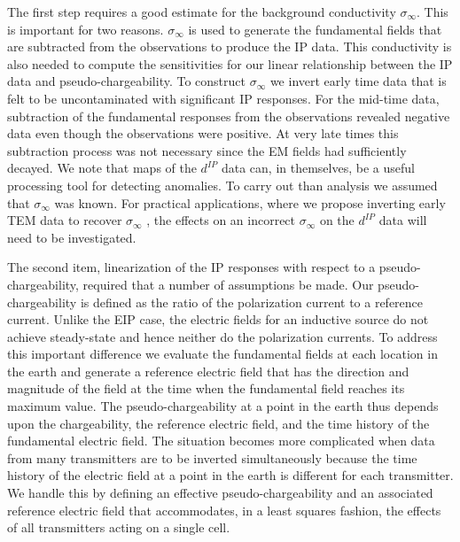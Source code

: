 \documentclass[extra,mreferee]{gji}
\newcommand{\siginf}{\sigma_\infty}
\begin{document}
The first step requires a good estimate for the background conductivity $\siginf$. This is important for two reasons. $\siginf$ is used to generate the fundamental fields that are subtracted from the observations to produce the IP data. This conductivity is also needed to compute the sensitivities for our linear relationship between the IP data and pseudo-chargeability. 
To construct $\siginf$ we invert early time data that is felt to be uncontaminated with significant IP responses.  For the mid-time data, subtraction of the fundamental responses from the observations revealed negative data even though the observations were positive. At very late times this subtraction process was not necessary since the EM fields had sufficiently decayed. 
We note that maps of the $d^{IP}$ data can, in themselves, be a useful processing tool for detecting anomalies. To carry out than analysis  we assumed that $\siginf$ was known. For practical applications, where we propose  inverting early TEM data to recover $\siginf$ , the effects on an incorrect $\siginf$ on the $d^{IP}$ data will need to be investigated. 




The second item, linearization of the IP responses with respect to a pseudo-chargeability, required that a number of assumptions be made. Our pseudo-chargeability is defined as the ratio of the polarization current to a reference current. Unlike the EIP case, the electric fields for an inductive source do not achieve steady-state and hence neither do the polarization currents. To address this important difference we evaluate the fundamental fields at each location in the earth and generate a reference electric field that has the direction and magnitude of the field at the time when the fundamental field  reaches its maximum value. The pseudo-chargeability at a point in the earth thus depends upon the chargeability, the reference electric field, and the time history of the fundamental electric field. The situation becomes more complicated when data from many transmitters are to be inverted simultaneously because the time history of the electric field at a point in the earth is different for each transmitter. We handle this by defining an effective pseudo-chargeability and an associated reference electric field that accommodates, in a least squares fashion, the effects of all transmitters acting on a single cell.
\end{document}
